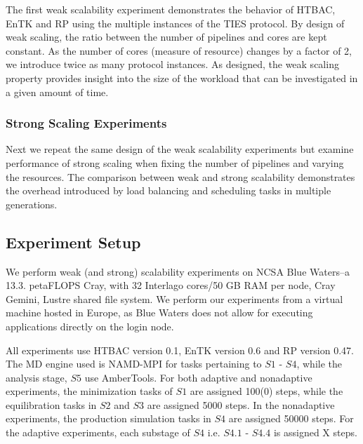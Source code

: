 The first weak scalability experiment demonstrates the behavior of HTBAC, EnTK
and RP using the multiple instances of the TIES protocol. By design of weak
scaling, the ratio between the number of pipelines and cores are kept
constant. As the number of
cores (measure of resource) changes by a factor of 2, we introduce twice as
many protocol instances. As designed, the weak scaling property provides
insight into the size of the workload that can be investigated in a given
amount of time.






\subsubsection {Strong Scaling Experiments} 

Next we repeat the same design of the weak scalability 
experiments but examine performance of strong scaling when fixing the number of 
pipelines and varying the resources. The comparison between weak and strong 
scalability demonstrates the overhead introduced by load balancing and 
scheduling tasks in multiple generations.

\subsection{Experiment Setup}\label{ssec:exp_design}

We perform weak (and strong) scalability experiments on NCSA Blue Waters--a 13.3. petaFLOPS Cray, with 32 Interlago cores/50 GB RAM per node, Cray Gemini, Lustre shared file system. We perform our 
experiments from a virtual machine hosted in Europe, as Blue 
Waters does not allow for executing applications directly on
the login node. 

All experiments use HTBAC version 0.1, EnTK version 0.6 and RP 
version 0.47. The MD engine used is NAMD-MPI for tasks pertaining to $S1$ - $S4$, while the analysis stage, $S5$ use AmberTools. For both adaptive and nonadaptive experiments, the minimization 
tasks of $S1$ are assigned 100(0) steps, while the equilibration
tasks in $S2$ and $S3$ are assigned 5000 steps. In the nonadaptive experiments, the production 
simulation tasks in $S4$ are assigned 50000 steps. For the
adaptive experiments, each substage of $S4$ i.e. $S4.1$ - $S4.4$ is assigned X steps. 

